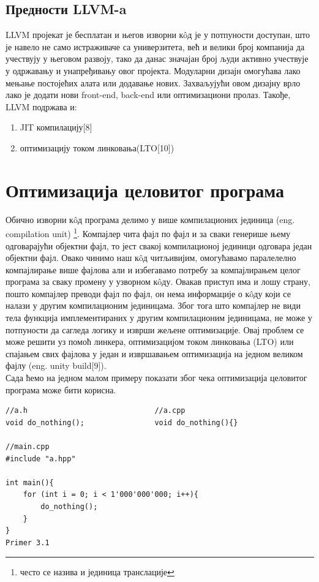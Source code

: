 \documentclass[12pt,oneside]{memoir}
\begin{document}
\section{Предности LLVM-a}

LLVM пројекат је бесплатан и његов изворни к\^{o}д је у потпуности доступан, 
што је навело не само истраживаче са универзитета, већ и велики број компанија 
да учествују у његовом развоју, тако да данас значајан број људи активно 
учествује у одржавању и унапређивању овог пројекта.
Модуларни дизајн омогућава лако мењање постојећих алата или додавање нових.
Захваљујући овом дизајну врло лако је додати нови front-end, back-end или
оптимизациони пролаз.
Такође, LLVM подржава и:
\begin{enumerate}
\item JIT компилацију[8]
\item оптимизацију током линковања(LTO[10])
\end{enumerate}

\chapter{Оптимизација целовитог програма}

Обично изворни к\^{o}д програма делимо у више компилационих јединица (eng. compilation unit) \footnote{често се назива и јединица транслације}.
Компајлер чита фајл по фајл и за сваки генерише њему одговарајући објектни фајл,
то јест свакој компилационој јединици одговара један објектни фајл.
Овако чинимо наш к\^{o}д читљивијим, омогућавамо паралелелно компајлирање више 
фајлова али и избегавамо потребу за компајлирањем целог програма за сваку промену
у узворном к\^{o}ду.
Овакав приступ има и лошу страну, пошто компајлер преводи фајл по фајл, он нема 
информације о к\^{o}ду који се налази у другим компилационим јединицама.
Због тога што компајлер не види тела функција имплементираних у другим компилационим
јединицама, не може у потпуности да сагледа логику и изврши жељене оптимизације.
Овај проблем се може решити уз помоћ линкера,
оптимизацијом током линковања (LTO) или спајањем свих фајлова у један и извршавањем
оптимизација на једном великом фајлу (eng. unity build[9]).
\\
Сада ћемо на једном малом примеру показати због чека оптимизација целовитог програма 
може бити корисна.

\begin{lstlisting}[frame=single]
//a.h                             //a.cpp
void do_nothing();                void do_nothing(){} 

//main.cpp          
#include "a.hpp"

int main(){
    for (int i = 0; i < 1'000'000'000; i++){
        do_nothing();
    }
}
Primer 3.1
\end{lstlisting}
\end{document}
